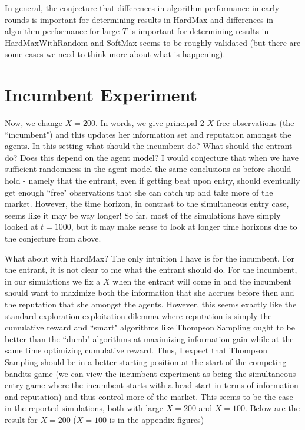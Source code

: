 \documentclass[11pt,letterpaper]{article}
\begin{document}
In general, the conjecture that differences in algorithm performance in early rounds is important for determining results in HardMax and differences in algorithm performance for large $T$ is important for determining results in HardMaxWithRandom and SoftMax seems to be roughly validated (but there are some cases we need to think more about what is happening).

\section*{Incumbent Experiment}
Now, we change $X = 200$. In words, we give principal 2 $X$ free observations (the ``incumbent") and this updates her information set and reputation amongst the agents. In this setting what should the incumbent do? What should the entrant do? Does this depend on the agent model? I would conjecture that when we have sufficient randomness in the agent model the same conclusions as before should hold - namely that the entrant, even if getting beat upon entry, should eventually get enough ``free" observations that she can catch up and take more of the market. However, the time horizon, in contrast to the simultaneous entry case, seems like it may be way longer! So far, most of the simulations have simply looked at $t = 1000$, but it may make sense to look at longer time horizons due to the conjecture from above. \\
\vspace{0.25cm}

What about with HardMax? The only intuition I have is for the incumbent. For the entrant, it is not clear to me what the entrant should do. For the incumbent, in our simulations we fix a $X$ when the entrant will come in and the incumbent should want to maximize both the information that she accrues before then and the reputation that she amongst the agents. However, this seems exactly like the standard exploration exploitation dilemma where reputation is simply the cumulative reward and ``smart" algorithms like Thompson Sampling ought to be better than the ``dumb" algorithms at maximizing information gain while at the same time optimizing cumulative reward. Thus, I expect that Thompson Sampling should be in a better starting position at the start of the competing bandits game (we can view the incumbent experiment as being the simultaneous entry game where the incumbent starts with a head start in terms of information and reputation) and thus control more of the market. This seems to be the case in the reported simulations, both with large $X = 200$ and $X = 100$. Below are the result for $X = 200$ ($X = 100$ is in the appendix figures)
\end{document}
